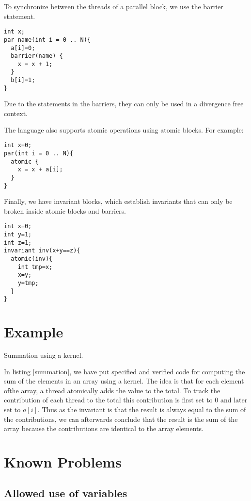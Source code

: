 To synchronize between the threads of a parallel block, we use the barrier statement.
\begin{lstlisting}
int x;
par name(int i = 0 .. N){
  a[i]=0;
  barrier(name) {
    x = x + 1;
  }
  b[i]=1;
}
\end{lstlisting}
Due to the statements in the barriers, they can only be used in
a divergence free context.

The language also supports atomic operations using atomic blocks.
For example:
\begin{lstlisting}
int x=0;
par(int i = 0 .. N){
  atomic {
    x = x + a[i];
  }
}
\end{lstlisting}

Finally, we have invariant blocks, which establish invariants
that can only be broken inside atomic blocks and barriers.
\begin{lstlisting}
int x=0;
int y=1;
int z=1;
invariant inv(x+y==z){
  atomic(inv){
    int tmp=x;
    x=y;
    y=tmp;
  }
}
\end{lstlisting}

\section{Example}

\begin{listing}

\caption{Summation using a kernel.}
\label{summation}
\end{listing}

In listing \ref{summation}, we have put specified and verified code
for computing the sum of the elements in an array using a kernel.
The idea is that for each element ofthe array, a thread atomically adds the
value to the total. To track the contribution of each thread to the total
this contribution is first set to $0$ and later set to $a[i]$. Thus as the invariant
is that the result is always equal to the sum of the contributions,
we can afterwards conclude that the result is the sum of the array
because the contributions are identical to the array elements.

\section{Known Problems}

\subsection{Allowed use of variables}

